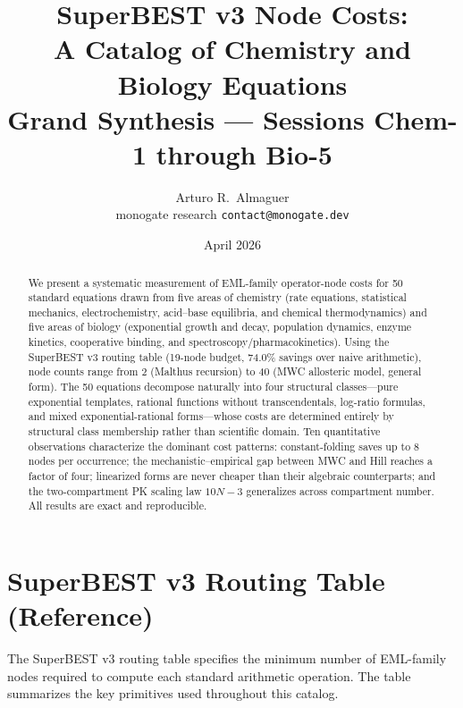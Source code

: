 \documentclass[12pt,a4paper]{article}
\title{SuperBEST v3 Node Costs:\\
       A Catalog of Chemistry and Biology Equations\\[6pt]
       \large Grand Synthesis --- Sessions Chem-1 through Bio-5}
\author{Arturo R.\ Almaguer\\
\small monogate research \quad \texttt{contact@monogate.dev}}
\date{April 2026}
\theoremstyle{definition}
\begin{document}
\maketitle

\begin{abstract}
We present a systematic measurement of EML-family operator-node costs for
50 standard equations drawn from five areas of chemistry (rate equations,
statistical mechanics, electrochemistry, acid--base equilibria, and chemical
thermodynamics) and five areas of biology (exponential growth and decay,
population dynamics, enzyme kinetics, cooperative binding, and
spectroscopy/pharmacokinetics).  Using the SuperBEST v3 routing table
(19-node budget, 74.0\% savings over naive arithmetic), node counts range
from 2 (Malthus recursion) to 40 (MWC allosteric model, general form).
The 50 equations decompose naturally into four structural classes---pure
exponential templates, rational functions without transcendentals, log-ratio
formulas, and mixed exponential-rational forms---whose costs are determined
entirely by structural class membership rather than scientific domain.
Ten quantitative observations characterize the dominant cost patterns:
constant-folding saves up to 8 nodes per occurrence; the mechanistic--empirical
gap between MWC and Hill reaches a factor of four; linearized forms are
never cheaper than their algebraic counterparts; and the two-compartment PK
scaling law $10N-3$ generalizes across compartment number.
All results are exact and reproducible.
\end{abstract}

\tableofcontents
\newpage

\section{SuperBEST v3 Routing Table (Reference)}
\label{sec:routing}

The SuperBEST v3 routing table specifies the minimum number of EML-family
nodes required to compute each standard arithmetic operation.  The table
summarizes the key primitives used throughout this catalog.
\end{document}
